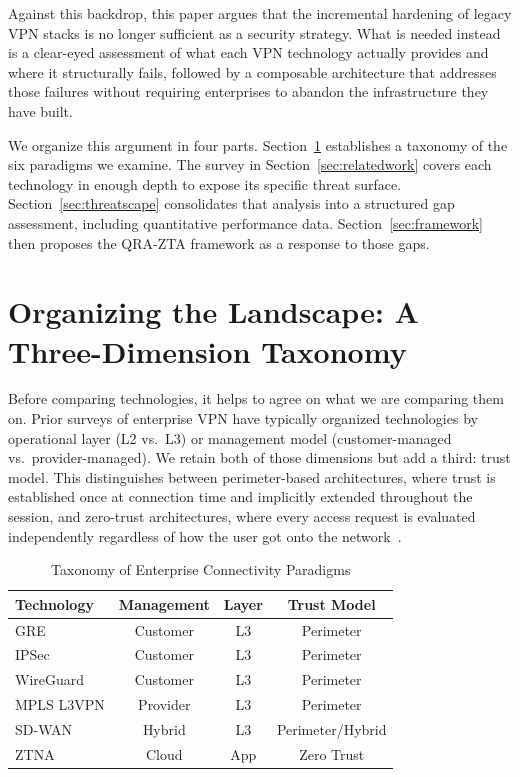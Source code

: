 \documentclass[conference]{IEEEtran}
\begin{document}
Against this backdrop, this paper argues that the incremental
hardening of legacy VPN stacks is no longer sufficient as a
security strategy. What is needed instead is a clear-eyed
assessment of what each VPN technology actually provides and
where it structurally fails, followed by a composable
architecture that addresses those failures without requiring
enterprises to abandon the infrastructure they have built.

We organize this argument in four parts. Section~\ref{sec:background}
establishes a taxonomy of the six paradigms we examine. The
survey in Section~\ref{sec:relatedwork} covers each technology
in enough depth to expose its specific threat surface.
Section~\ref{sec:threatscape} consolidates that analysis into
a structured gap assessment, including quantitative performance
data. Section~\ref{sec:framework} then proposes the QRA-ZTA
framework as a response to those gaps.

\section{Organizing the Landscape: A Three-Dimension Taxonomy}
\label{sec:background}

Before comparing technologies, it helps to agree on what we are
comparing them on. Prior surveys of enterprise VPN have typically
organized technologies by operational layer (L2 vs.\ L3) or
management model (customer-managed vs.\ provider-managed). We
retain both of those dimensions but add a third: trust model.
This distinguishes between perimeter-based architectures, where
trust is established once at connection time and implicitly
extended throughout the session, and zero-trust architectures,
where every access request is evaluated independently regardless
of how the user got onto the network~\cite{nist800207}.

\begin{table}[htbp]
\caption{Taxonomy of Enterprise Connectivity Paradigms}
\label{tab:taxonomy}
\centering
\renewcommand{\arraystretch}{1.2}
\begin{tabular}{lccc}
\toprule
\textbf{Technology} & \textbf{Management} & \textbf{Layer} & \textbf{Trust Model} \\
\midrule
GRE         & Customer  & L3      & Perimeter \\
IPSec       & Customer  & L3      & Perimeter \\
WireGuard   & Customer  & L3      & Perimeter \\
MPLS L3VPN  & Provider  & L3      & Perimeter \\
SD-WAN      & Hybrid    & L3      & Perimeter/Hybrid \\
ZTNA        & Cloud     & App     & Zero Trust \\
\bottomrule
\end{tabular}
\end{table}
\end{document}

